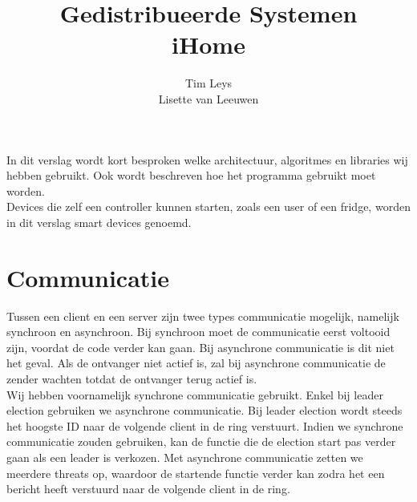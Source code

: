 \documentclass[a4paper]{article}
\title{ %
	Gedistribueerde Systemen \\
	\large iHome
	}
\author{ %
	Tim Leys \\
	Lisette van Leeuwen \\
	}
\begin{document}
	\maketitle
	
	In dit verslag wordt kort besproken welke architectuur, algoritmes en libraries wij hebben gebruikt. Ook wordt beschreven hoe het programma gebruikt moet worden. \\
	Devices die zelf een controller kunnen starten, zoals een user of een fridge, worden in dit verslag smart devices genoemd. 
	
	\section{Communicatie}
		Tussen een client en een server zijn twee types communicatie mogelijk, namelijk synchroon en asynchroon. Bij synchroon moet de communicatie eerst voltooid zijn, voordat de code verder kan gaan. Bij asynchrone communicatie is dit niet het geval. Als de ontvanger niet actief is, zal bij asynchrone communicatie de zender wachten totdat de ontvanger terug actief is. \\
		Wij hebben voornamelijk synchrone communicatie gebruikt. Enkel bij leader election gebruiken we asynchrone communicatie. Bij leader election wordt steeds het hoogste ID naar de volgende client in de ring verstuurt. Indien we synchrone communicatie zouden gebruiken, kan de functie die de election start pas verder gaan als een leader is verkozen. Met asynchrone communicatie zetten we meerdere threats op, waardoor de startende functie verder kan zodra het een bericht heeft verstuurd naar de volgende client in de ring. 
		
\end{document}
